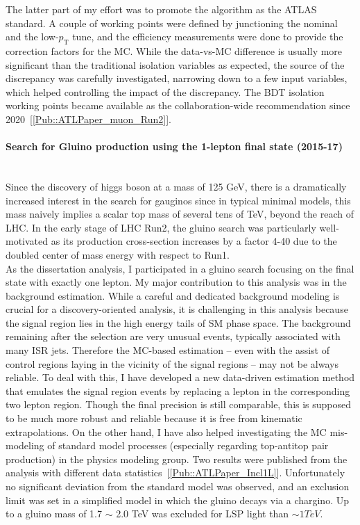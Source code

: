 \documentclass[12pt]{article}
\newcommand{\Subsubsection}[1]{\subsubsection*{#1}
\addcontentsline{toc}{subsubsection}{#1}}
\newcommand{\pt}{\ensuremath{p_{\text{T}}}\xspace}
\begin{document}
The latter part of my effort was to promote the algorithm as the ATLAS standard.
A couple of working points were defined by junctioning the nominal and the low-\pt tune, and the efficiency measurements were done to provide the correction factors for the MC.
While the data-vs-MC difference is usually more significant than the traditional isolation variables as expected, the source of the discrepancy was carefully investigated, narrowing down to a few input variables, which helped controlling the impact of the discrepancy.
The BDT isolation working points became available as the collaboration-wide recommendation since 2020~[\ref{Pub::ATLPaper_muon_Run2}].


\paragraph{Search for Gluino production using the 1-lepton final state (2015-17)}  \phantom{k} \vspace{3mm} \\
Since the discovery of higgs boson at a mass of 125 GeV, there is a dramatically increased interest in the search for gauginos since in typical minimal models, this mass naively implies a scalar top mass of several tens of TeV, beyond the reach of LHC. In the early stage of LHC Run2, the gluino search was particularly well-motivated as its production cross-section increases by a factor 4-40 due to the doubled center of mass energy with respect to Run1. \\

As the dissertation analysis, I participated in a gluino search focusing on the final state with exactly one lepton. 
My major contribution to this analysis was in the background estimation. 
While a careful and dedicated background modeling is crucial for a discovery-oriented analysis, 
it is challenging in this analysis because the signal region lies in the high energy tails of SM phase space. 
The background remaining after the selection are very unusual events, 
typically associated with many ISR jets. 
Therefore the MC-based estimation -- even with the assist of control regions laying in the vicinity of the signal regions -- may not be always reliable.
To deal with this, I have developed a new data-driven estimation method that emulates the signal region events by replacing a lepton in the corresponding two lepton region.
Though the final precision is still comparable, this is supposed to be much more robust and reliable because it is free from kinematic extrapolations.
On the other hand, I have also helped investigating the MC mis-modeling of standard model processes (especially regarding top-antitop pair production) in the physics modeling group.
Two results were published from the analysis with different data statistics~[\ref{Pub::ATLPaper_Incl1L}]. 
Unfortunately no significant deviation from the standard model was observed, and an exclusion limit was set in a simplified model in which the gluino decays via a chargino.
Up to a gluino mass of 1.7 $\sim$ 2.0 TeV was excluded for LSP light than $\sim1TeV$. \\ \\
\end{document}
